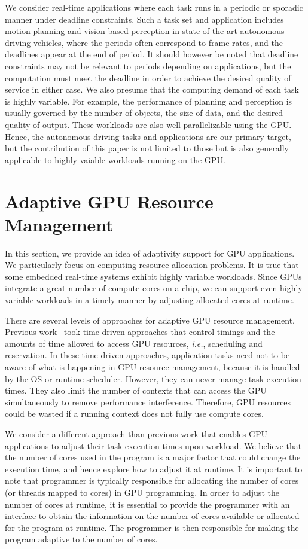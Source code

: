 \documentclass[times, 10pt, twocolumn]{article}
\begin{document}
We consider real-time applications where each task runs in a periodic or
sporadic manner under deadline constraints.
Such a task set and application includes motion planning and 
vision-based perception in state-of-the-art autonomous driving
vehicles, where the periods often correspond to frame-rates, and the
deadlines appear at the end of period.
It should however be noted that deadline constraints may not be relevant
to periods depending on applications, but the computation must meet the
deadline in order to achieve the desired quality of service in either case.
We also presume that the computing demand of each task is highly
variable.
For example, the performance of planning and perception is usually
governed by the number of objects, the size of data, and the desired
quality of output.
These workloads are also well parallelizable using the GPU.
Hence, the autonomous driving tasks and applications are our primary
target, but the contribution of this paper is not limited to those but
is also generally applicable to highly vaiable workloads running on the
GPU.

\section{Adaptive GPU Resource Management}
\label{sec:adaptivity_support}

In this section, we provide an idea of adaptivity support for GPU
applications.
We particularly focus on computing resource allocation problems.
It is true that some embedded real-time systems exhibit highly variable
workloads.
Since GPUs integrate a great number of compute cores on a chip, we can
support even highly variable workloads in a timely manner by adjusting
allocated cores at runtime.

There are several levels of approaches for adaptive GPU resource
management.
Previous work~\cite{Kato_RTAS11, Kato_RTSS11, Kato_ATC11} took
time-driven approaches that control timings and the amounts of time
allowed to access GPU resources, \textit{i.e.}, scheduling and
reservation.
In these time-driven approaches, application tasks need not to be aware
of what is happening in GPU resource management, because it is handled
by the OS or runtime scheduler.
However, they can never manage task execution times.
They also limit the number of contexts that can access the GPU
simultaneously to remove performance interference.
Therefore, GPU resources could be wasted if a running context does not
fully use compute cores.

We consider a different approach than previous work that enables GPU
applications to adjust their task execution times upon workload.
We believe that the number of cores used in the program is a major
factor that could change the execution time, and hence explore how to
adjust it at runtime.
It is important to note that programmer is typically responsible for
allocating the number of cores (or threads mapped to cores) in GPU
programming.
In order to adjust the number of cores at runtime, it is essential to
provide the programmer with an interface to obtain the information on
the number of cores available or allocated for the program at runtime.
The programmer is then responsible for making the program adaptive to
the number of cores.
\end{document}
